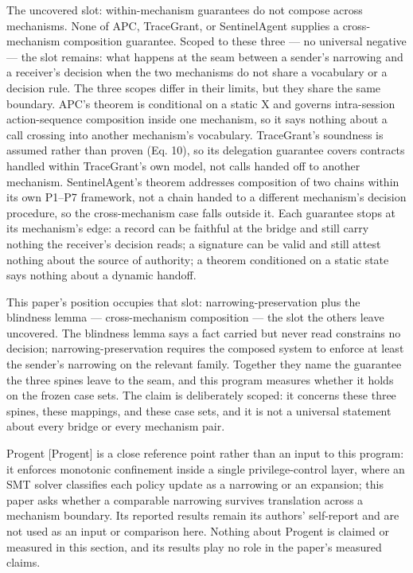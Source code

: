 \documentclass[
  10pt,
]{article}
\renewcommand{\_}{\origunderscore\allowbreak}
\begin{document}
The uncovered slot: within-mechanism guarantees do not compose across
mechanisms. None of APC, TraceGrant, or SentinelAgent supplies a
cross-mechanism composition guarantee. Scoped to these three --- no
universal negative --- the slot remains: what happens at the seam
between a sender's narrowing and a receiver's decision when the two
mechanisms do not share a vocabulary or a decision rule. The three
scopes differ in their limits, but they share the same boundary. APC's
theorem is conditional on a static X and governs intra-session
action-sequence composition inside one mechanism, so it says nothing
about a call crossing into another mechanism's vocabulary. TraceGrant's
soundness is assumed rather than proven (Eq. 10), so its delegation
guarantee covers contracts handled within TraceGrant's own model, not
calls handed off to another mechanism. SentinelAgent's theorem addresses
composition of two chains within its own P1--P7 framework, not a chain
handed to a different mechanism's decision procedure, so the
cross-mechanism case falls outside it. Each guarantee stops at its
mechanism's edge: a record can be faithful at the bridge and still carry
nothing the receiver's decision reads; a signature can be valid and
still attest nothing about the source of authority; a theorem
conditioned on a static state says nothing about a dynamic handoff.

This paper's position occupies that slot: narrowing-preservation plus
the blindness lemma --- cross-mechanism composition --- the slot the
others leave uncovered. The blindness lemma says a fact carried but
never read constrains no decision; narrowing-preservation requires the
composed system to enforce at least the sender's narrowing on the
relevant family. Together they name the guarantee the three spines leave
to the seam, and this program measures whether it holds on the frozen
case sets. The claim is deliberately scoped: it concerns these three
spines, these mappings, and these case sets, and it is not a universal
statement about every bridge or every mechanism pair.

Progent {[}Progent{]} is a close reference point rather than an input to
this program: it enforces monotonic confinement inside a single
privilege-control layer, where an SMT solver classifies each policy
update as a narrowing or an expansion; this paper asks whether a
comparable narrowing survives translation across a mechanism boundary.
Its reported results remain its authors' self-report and are not used as
an input or comparison here. Nothing about Progent is claimed or
measured in this section, and its results play no role in the paper's
measured claims.
\end{document}
